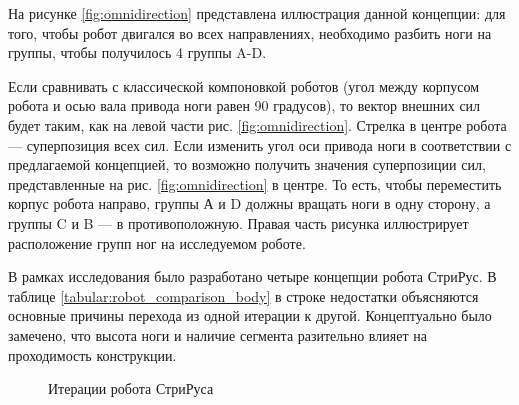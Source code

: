 На рисунке \ref{fig:omnidirection} представлена иллюстрация данной концепции: для того, чтобы робот двигался во всех направлениях, необходимо разбить ноги на группы, чтобы получилось 4 группы A-D.

Если сравнивать с классической компоновкой роботов (угол между корпусом робота и осью вала привода ноги равен 90 градусов), то вектор внешних сил будет таким, как на левой части рис. \ref{fig:omnidirection}. Стрелка в центре робота — суперпозиция всех сил. Если изменить угол оси привода ноги в соответствии с предлагаемой концепцией, то возможно получить значения суперпозиции сил, представленные на рис. \ref{fig:omnidirection} в центре. То есть, чтобы переместить корпус робота направо, группы А и D должны вращать ноги в одну сторону, а группы C и B — в противоположную. Правая часть рисунка иллюстрирует расположение групп ног на исследуемом роботе. 

В рамках исследования было разработано четыре концепции робота СтриРус. В таблице \ref{tabular:robot_comparison_body} в строке недостатки объясняются основные причины перехода из одной итерации к другой. Концептуально было замечено, что высота ноги и наличие сегмента разительно влияет на проходимость конструкции. \quad {}

\begin{figure}[H]
    \caption{Итерации робота СтриРуса}\label{fig:striruses}
  \end{figure}

